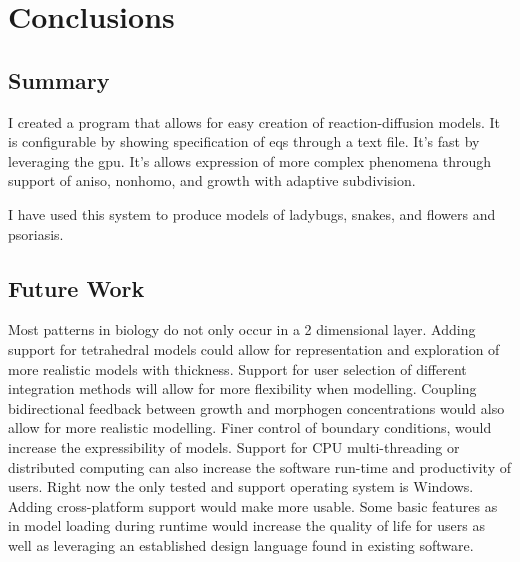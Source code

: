 \chapter{Conclusions}
\section{Summary}
I created a program that allows for easy creation of reaction-diffusion models. It is configurable by showing specification of eqs through a text file. It's fast by leveraging the gpu. It's allows expression of more complex phenomena through support of aniso, nonhomo, and growth with adaptive subdivision.

I have used this system to produce models of ladybugs, snakes, and flowers and psoriasis.




\section{Future Work}
Most patterns in biology do not only occur in a 2 dimensional layer. Adding support for tetrahedral models could allow for representation and exploration of more realistic models with thickness. Support for user selection of different integration methods will allow for more flexibility when modelling. Coupling bidirectional feedback between growth and morphogen concentrations would also allow for more realistic modelling. Finer control of boundary conditions, would increase the expressibility of models. Support for CPU multi-threading or distributed computing can also increase the software run-time and productivity of users. Right now the only tested and support operating system is Windows. Adding cross-platform support would make \ProgramName{} more usable. Some basic features as in model loading during runtime would increase the quality of life for users as well as leveraging an established design language found in existing software.

